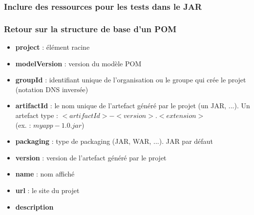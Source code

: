 \documentclass{beamer}
\begin{document}
\begin{frame}[fragile]
  \frametitle{Inclure des ressources pour les tests dans le JAR}
\end{frame}

\begin{frame}[fragile]
  \frametitle{Retour sur la structure de base d'un POM}
  \begin{itemize}
  \item \textbf{project} : élément racine
  \item \textbf{modelVersion} : version du modèle POM
  \item \textbf{groupId} : identifiant unique de l'organisation ou le
    groupe qui crée le projet (notation DNS inversée)
  \item \textbf{artifactId} : le nom unique de l'artefact généré par
    le projet (un JAR, ...). Un artefact type :
    $<artifactId>-<version>.<extension>$\\
    (ex. : $myapp-1.0.jar$)
    \item \textbf{packaging} : type de packaging (JAR, WAR, ...). JAR
      par défaut
    \item \textbf{version} : version de l'artefact généré par le
      projet
    \item \textbf{name} : nom affiché
    \item \textbf{url} : le site du projet
    \item \textbf{description}
  \end{itemize}    
\end{frame}
\end{document}
